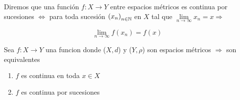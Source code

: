 \begin{definition}
    Diremos que una función $f : X \to Y$ entre espacios métricos es continua por sucesiones $\iff$ para toda sucesión ${(x_n)}_{n \in \mathbb{N}}$ en $X$ tal que $\lim\limits_{n \to \infty} x_n = x \Rightarrow$

    $$\lim\limits_{n \to \infty} f(x_n) = f(x)$$
\end{definition}

\begin{theorem} \label{theom235}
    Sea $f : X \to Y$ una funcion donde ($X,d$) y ($Y,\rho$) son espacios métricos $\Rightarrow$ son equivalentes

    \begin{enumerate}
        \item $f$ es continua en toda $x \in X$
        \item $f$ es continua por sucesiones
    \end{enumerate}
\end{theorem}

